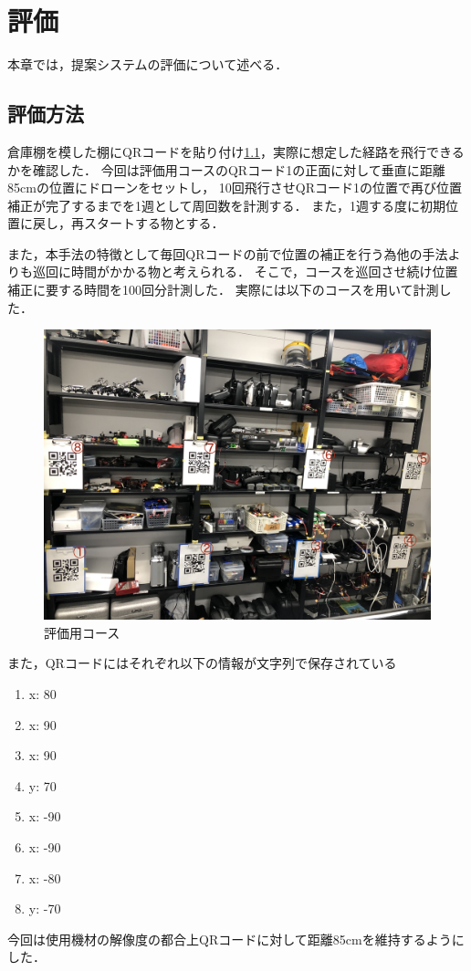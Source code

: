 \chapter{評価}
\label{evaluation}
本章では，提案システムの評価について述べる．

\section{評価方法}
倉庫棚を模した棚にQRコードを貼り付け\ref{course}，実際に想定した経路を飛行できるかを確認した．
今回は評価用コースのQRコード1の正面に対して垂直に距離85cmの位置にドローンをセットし，
10回飛行させQRコード1の位置で再び位置補正が完了するまでを1週として周回数を計測する．
また，1週する度に初期位置に戻し，再スタートする物とする．

また，本手法の特徴として毎回QRコードの前で位置の補正を行う為他の手法よりも巡回に時間がかかる物と考えられる．
そこで，コースを巡回させ続け位置補正に要する時間を100回分計測した．
実際には以下のコースを用いて計測した．


\begin{figure}[htbp]
  \begin{center}
    \includegraphics[clip,width=15.0cm]{img/course.jpg}
    \caption{評価用コース}
    \label{course}
  \end{center}
\end{figure}

また，QRコードにはそれぞれ以下の情報が文字列で保存されている
\begin{enumerate}
    \item {x: 80}
    \item {x: 90}
    \item {x: 90}
    \item {y: 70}
    \item {x: -90}
    \item {x: -90}
    \item {x: -80}
    \item {y: -70}
\end{enumerate}

今回は使用機材の解像度の都合上QRコードに対して距離85cmを維持するようにした．



